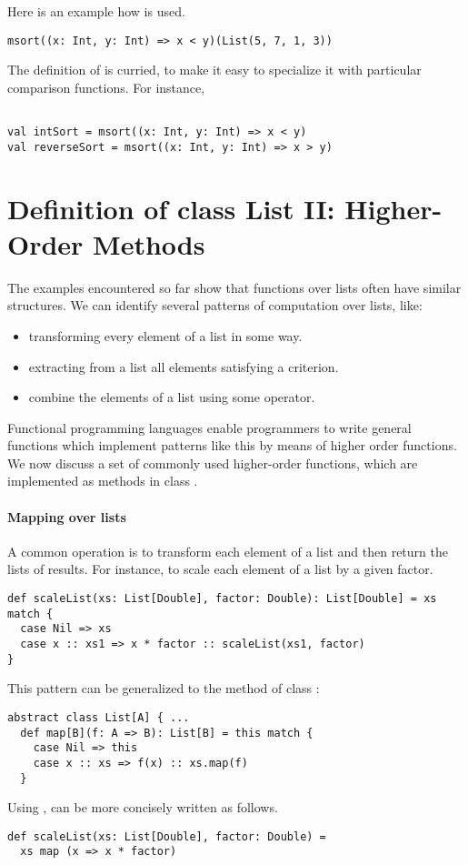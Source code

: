Here is an example how  is used.
\begin{lstlisting}
msort((x: Int, y: Int) => x < y)(List(5, 7, 1, 3))
\end{lstlisting}
The definition of  is curried, to make it easy to specialize it with particular
comparison functions. For instance,
\begin{lstlisting}

val intSort = msort((x: Int, y: Int) => x < y)
val reverseSort = msort((x: Int, y: Int) => x > y)
\end{lstlisting}

\section{Definition of class List II: Higher-Order Methods}

The examples encountered so far show that functions over lists often
have similar structures. We can identify several patterns of
computation over lists, like:
\begin{itemize}
      \item transforming every element of a list in some way.
      \item extracting from a list all elements satisfying a criterion.
      \item combine the elements of a list using some operator.
\end{itemize}
Functional programming languages enable programmers to write general
functions which implement patterns like this by means of higher order
functions. We now discuss a set of commonly used higher-order
functions, which are implemented as methods in class .

\paragraph{Mapping over lists}
A common operation is to transform each element of a list and then
return the lists of results.  For instance, to scale each element of a
list by a given factor.
\begin{lstlisting}
def scaleList(xs: List[Double], factor: Double): List[Double] = xs match {
  case Nil => xs
  case x :: xs1 => x * factor :: scaleList(xs1, factor)
}
\end{lstlisting}
This pattern can be generalized to the  method of class :
\begin{lstlisting}
abstract class List[A] { ...
  def map[B](f: A => B): List[B] = this match {
    case Nil => this
    case x :: xs => f(x) :: xs.map(f)
  }
\end{lstlisting}
Using ,  can be more concisely written as follows.
\begin{lstlisting}
def scaleList(xs: List[Double], factor: Double) =
  xs map (x => x * factor)
\end{lstlisting}

